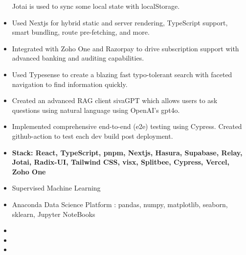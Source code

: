 \documentclass[10pt,a4paper,ragged2e,withhyper]{altacv}
\begin{document}
\begin{paracol}{2}
\begin{itemize}
Jotai is used to sync some local state with localStorage.
\item Used Nextjs for hybrid static and server rendering, TypeScript support, smart bundling, route pre-fetching, and more.
\item Integrated with Zoho One and Razorpay to drive subscription support with advanced banking and auditing capabilities. 
\item Used Typesense to create a blazing fast typo-tolerant search with faceted navigation to find information quickly.
\item Created an advanced RAG client sivaGPT which allows users to ask questions using natural language using OpenAI's gpt4o.
\item Implemented comprehensive end-to-end (e2e) testing using Cypress.
      Created github-action to test each dev build post deployment.
\item \textbf{Stack: React, TypeScript, pnpm, Nextjs, Hasura, Supabase, Relay, Jotai, Radix-UI, Tailwind CSS, visx, Splitbee, Cypress, Vercel, Zoho One}
\end{itemize}

\bigskip

\medskip
{}
\begin{itemize}
\smallskip
\item Supervised Machine Learning
\item Anaconda Data Science Platform : pandas, numpy, matplotlib, seaborn, sklearn, Jupyter NoteBooks
\end{itemize}


\bigskip
{}
\begin{itemize}
\item{}
\smallskip
\item{}
\smallskip
\item{}
\end{itemize}






\end{paracol}
\end{document}
